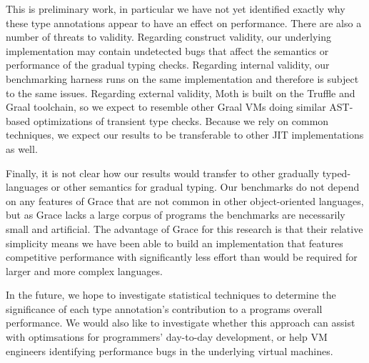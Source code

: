 \documentclass[sigplan,10pt,review,screen]{acmart}\settopmatter{printfolios=true}
\newcommand{\RR}[1]{{\color{red}RR: #1}}
\begin{document}
This is preliminary work, in particular we have not yet identified exactly why these type annotations appear to have an effect on performance.
There are also a number of threats to validity. 
Regarding construct validity, 
our underlying
implementation may contain undetected bugs that affect the semantics
or performance of the gradual typing checks. Regarding internal
validity,
our benchmarking harness runs on the same implementation
and therefore is subject to the same issues.
Regarding external validity, 
Moth is built
on the Truffle and Graal toolchain, so we expect
to resemble other Graal
VMs doing similar AST-based optimizations of transient type checks.
Because we rely on common techniques, 
we expect our results to be transferable to other JIT implementations as well.

Finally, it is not clear how our results would transfer
to other gradually typed-languages or other semantics for gradual typing.
Our benchmarks do not depend on any features of Grace
that are not common in other object-oriented
languages, but as Grace lacks a large corpus of programs the
benchmarks are necessarily small and artificial.
The advantage of Grace for this research is
that their relative simplicity means we have been able to build an
implementation that features competitive performance with significantly less
effort than would be required for larger and more complex languages.

In the future, we hope to investigate statistical techniques to
determine the significance of each type annotation's contribution to a
programs overall performance. We would also like to investigate 
whether this approach can assist with optimsations for programmers' day-to-day  development, or help VM engineers identifying performance bugs in the underlying virtual machines.


\end{document}
